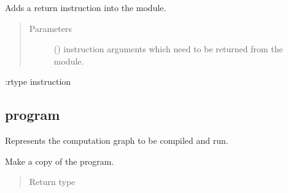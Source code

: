 \documentclass[letterpaper,10pt,english]{sphinxmanual}
\begin{document}

\begin{fulllineitems}
\label{\detokenize{reference/py:migraphx.add_return}}
\sphinxAtStartPar
Adds a return instruction into the module.
\begin{quote}\begin{description}
\item[{Parameters}] \leavevmode
\sphinxAtStartPar
{} (\sphinxstyleliteralemphasis{\sphinxupquote{{[}}}\sphinxstyleliteralemphasis{\sphinxupquote{{]}}}) \textendash{} instruction arguments which need to be returned from the module.

\end{description}\end{quote}

\sphinxAtStartPar
:rtype instruction

\end{fulllineitems}



\subsection{program}
\label{\detokenize{reference/py:program}}

\begin{fulllineitems}
\label{\detokenize{reference/py:migraphx.program}}
\sphinxAtStartPar
Represents the computation graph to be compiled and run.

\end{fulllineitems}


\begin{fulllineitems}
\label{\detokenize{reference/py:migraphx.clone}}
\sphinxAtStartPar
Make a copy of the program.
\begin{quote}\begin{description}
\item[{Return type}] \leavevmode
\sphinxAtStartPar
{\hyperref[\detokenize{reference/py:migraphx.program}]{}}

\end{description}\end{quote}

\end{fulllineitems}
\end{document}
